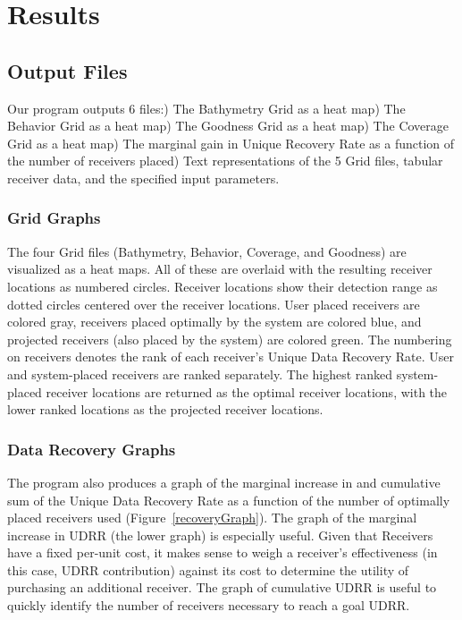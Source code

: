\chapter{Results}
\section{Output Files}
Our program outputs 6 files:) The Bathymetry Grid as a heat map) The Behavior Grid as a heat map) The Goodness Grid as a heat map) The Coverage Grid as a heat map) The marginal gain in Unique Recovery Rate as a function of the number of receivers placed) Text representations of the 5 Grid files, tabular receiver data, and the specified input parameters.\newline

\subsection{Grid Graphs}
The four Grid files (Bathymetry, Behavior, Coverage, and Goodness) are visualized as a heat maps.  All of these are overlaid with the resulting receiver locations as numbered circles.  Receiver locations show their detection range as dotted circles centered over the receiver locations.  User placed receivers are colored gray, receivers placed optimally by the system are colored blue, and projected receivers (also placed by the system) are colored green.  The numbering on receivers denotes the rank of each receiver's Unique Data Recovery Rate.  User and system-placed receivers are ranked separately.  The highest ranked system-placed receiver locations are returned as the optimal receiver locations, with the lower ranked locations as the projected receiver locations.


\subsection{Data Recovery Graphs}
The program also produces a graph of the marginal increase in and cumulative sum of the Unique Data Recovery Rate as a function of the number of optimally placed receivers used (Figure~\ref{recoveryGraph}).  The graph of the marginal increase in UDRR (the lower graph) is especially useful.  Given that Receivers have a fixed per-unit cost, it makes sense to weigh a receiver's effectiveness (in this case, UDRR contribution) against its cost to determine the utility of purchasing an additional receiver.  The graph of cumulative UDRR is useful to quickly identify the number of receivers necessary to reach a goal UDRR.

